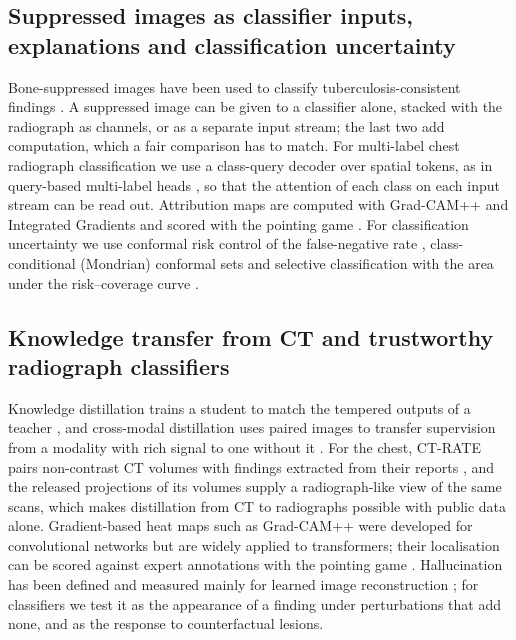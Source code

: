 \subsection{Suppressed images as classifier inputs, explanations and classification uncertainty}
Bone-suppressed images have been used to classify tuberculosis-consistent findings \citep{rajaraman2021bone}. A suppressed image can be
given to a classifier alone, stacked with the radiograph as channels, or as a separate input stream; the last two add computation, which a fair
comparison has to match. For
multi-label chest radiograph classification we use a class-query decoder over spatial tokens, as in query-based multi-label heads
\citep{liu2021query2label,ridnik2023mldecoder}, so that the attention of each class on each input stream can be read out. Attribution maps are
computed with Grad-CAM++ \citep{chattopadhay2018gradcampp} and Integrated Gradients \citep{sundararajan2017axiomatic} and scored with the
pointing game \citep{zhang2018topdown}. For classification uncertainty we use conformal risk control of the false-negative rate
\citep{angelopoulos2022crc}, class-conditional (Mondrian) conformal sets \citep{vovk2005algorithmic} and selective classification with the
area under the risk--coverage curve \citep{geifman2017selective,geifman2019bias}.

\subsection{Knowledge transfer from CT and trustworthy radiograph classifiers}
Knowledge distillation trains a student to match the tempered outputs of a teacher \citep{hinton2015distilling}, and cross-modal
distillation uses paired images to transfer supervision from a modality with rich signal to one without it \citep{gupta2016crossmodal}. For
the chest, CT-RATE pairs non-contrast CT volumes with findings extracted from their reports \citep{hamamci2026ctrate}, and the released
projections of its volumes \citep{angaitkar2026anatomy} supply a radiograph-like view of the same scans, which makes distillation from CT to
radiographs possible with public data alone. Gradient-based heat maps such as Grad-CAM++ were developed for convolutional networks
\citep{chattopadhay2018gradcampp} but are widely applied to transformers; their localisation can be scored against expert annotations with
the pointing game \citep{zhang2018topdown}. Hallucination has been defined and measured mainly for learned image reconstruction
\citep{bhadra2021hallucinations,tivnan2024hallucination}; for classifiers we test it as the appearance of a finding under perturbations
that add none, and as the response to counterfactual lesions.
